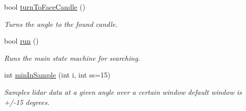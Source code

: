 \begin{DoxyCompactItemize}
\item 
bool \hyperlink{classSearcher_a557322c3deb361501d199b541ca7fdd3}{turn\-To\-Face\-Candle} ()
\begin{DoxyCompactList}\small\item\em Turns the angle to the found candle. \end{DoxyCompactList}\item 
bool \hyperlink{classSearcher_aaea092416ef215eb96f46ef3d6f1b581}{run} ()
\begin{DoxyCompactList}\small\item\em Runs the main state machine for searching. \end{DoxyCompactList}\item 
int \hyperlink{classSearcher_a72f0af23bc595eaa70e4fb017eac8d79}{min\-In\-Sample} (int i, int ss=15)
\begin{DoxyCompactList}\small\item\em Samples lidar data at a given angle over a certain window default window is +/-\/15 degrees. \end{DoxyCompactList}\end{DoxyCompactItemize}
